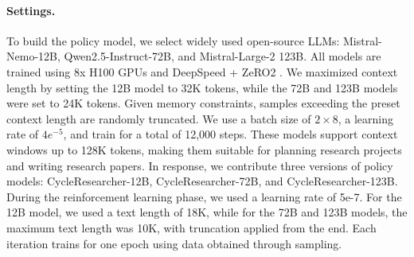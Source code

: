 \documentclass{article} %
\begin{document}



\paragraph{Settings.} To build the policy model, we select widely used open-source LLMs: Mistral-Nemo-12B, Qwen2.5-Instruct-72B, and Mistral-Large-2 123B. All models are trained using 8x H100 GPUs and DeepSpeed + ZeRO2 \citep{rajbhandari2020zeromemoryoptimizationstraining,10.1145/3394486.3406703}. We maximized context length by setting the 12B model to 32K tokens, while the 72B and 123B models were set to 24K tokens. Given memory constraints, samples exceeding the preset context length are randomly truncated. We use a batch size of $2 \times 8$, a learning rate of $4e^{-5}$, and train for a total of 12,000 steps. These models support context windows up to 128K tokens, making them suitable for planning research projects and writing research papers.  In response, we contribute three versions of policy models: CycleResearcher-12B, CycleResearcher-72B, and CycleResearcher-123B. During the reinforcement learning phase, we used a learning rate of 5e-7. For the 12B model, we used a text length of 18K, while for the 72B and 123B models, the maximum text length was 10K, with truncation applied from the end. Each iteration trains for one epoch using data obtained through sampling.


\end{document}
